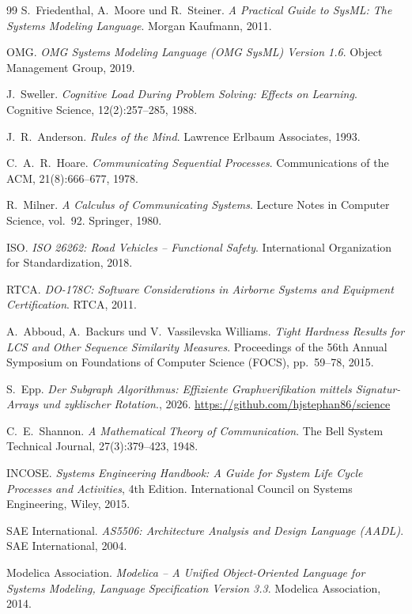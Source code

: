 ﻿\documentclass[a4paper,12pt]{article}
\theoremstyle{definition}
\begin{document}
\begin{thebibliography}{99}
S.~Friedenthal, A.~Moore und R.~Steiner.
\textit{A Practical Guide to SysML: The Systems Modeling Language}.
Morgan Kaufmann, 2011.

OMG.
\textit{OMG Systems Modeling Language (OMG SysML) Version 1.6}.
Object Management Group, 2019.

J.~Sweller.
\textit{Cognitive Load During Problem Solving: Effects on Learning}.
Cognitive Science, 12(2):257--285, 1988.

J.~R.~Anderson.
\textit{Rules of the Mind}.
Lawrence Erlbaum Associates, 1993.

C.~A.~R.~Hoare.
\textit{Communicating Sequential Processes}.
Communications of the ACM, 21(8):666--677, 1978.

R.~Milner.
\textit{A Calculus of Communicating Systems}.
Lecture Notes in Computer Science, vol.~92. Springer, 1980.

ISO.
\textit{ISO 26262: Road Vehicles -- Functional Safety}.
International Organization for Standardization, 2018.

RTCA.
\textit{DO-178C: Software Considerations in Airborne Systems and Equipment
Certification}.
RTCA, 2011.

A.~Abboud, A.~Backurs und V.~Vassilevska Williams.
\textit{Tight Hardness Results for LCS and Other Sequence Similarity Measures}.
Proceedings of the 56th Annual Symposium on Foundations of Computer Science
(FOCS), pp.~59--78, 2015.

S.~Epp.
\textit{Der Subgraph Algorithmus: Effiziente Graphverifikation mittels
Signatur-Arrays und zyklischer Rotation}., 2026.
\url{https://github.com/hjstephan86/science}

C.~E.~Shannon.
\textit{A Mathematical Theory of Communication}.
The Bell System Technical Journal, 27(3):379--423, 1948.

INCOSE.
\textit{Systems Engineering Handbook: A Guide for System Life Cycle Processes
and Activities}, 4th Edition.
International Council on Systems Engineering, Wiley, 2015.

SAE International.
\textit{AS5506: Architecture Analysis and Design Language (AADL)}.
SAE International, 2004.

Modelica Association.
\textit{Modelica -- A Unified Object-Oriented Language for Systems Modeling,
Language Specification Version 3.3}.
Modelica Association, 2014.


\end{thebibliography}
\end{document}
